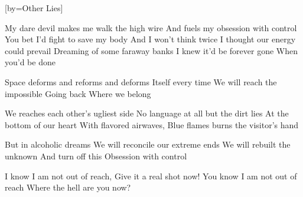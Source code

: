 [by={Other Lies}]

  \chordsoff

  \beginverse
  My dare devil makes me walk the high wire
  And fuels my obsession with control
  You bet I'd fight to save my body
  And I won’t think twice
  I thought our energy could prevail
  Dreaming of some faraway banks
  I knew it’d be forever gone
  When you’d be done
  \endverse
  
  \beginchorus
  Space deforms and reforms and deforms
  Itself every time
  We will reach the impossible
  Going back
  Where we belong
  \endchorus
  
  \beginverse
  We reaches each other’s ugliest side
  No language at all but the dirt lies 
  At the bottom of our heart
  With flavored airwaves,
  Blue flames burns the visitor's hand
  \endverse

  \beginchorus
  But in alcoholic dreams
  We will reconcile our extreme ends
  We will rebuilt the unknown
  And turn off this
  Obsession with control
  \endchorus


  \beginverse
  I know I am not out of reach,
  Give it a real shot now!
  You know I am not out of reach
  Where the hell are you now?
  \endverse
\endsong
